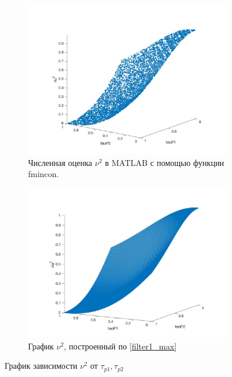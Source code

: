 \documentclass[a4paper,14pt]{article} %
\theoremstyle{cited}
\begin{document}
\begin{figure}[H]
\begin{subfigure}{.5\textwidth}
  \includegraphics[width=9cm]{images/filter1e.jpg}
  \caption{Численная оценка $\nu^2$ в MATLAB с помощью функции fmincon.}
  \label{fig:sub1}
\end{subfigure}%
\begin{subfigure}{.5\textwidth}
\includegraphics[width=9cm]{images/filter1_1.jpg}
  \caption{График $\nu^2$, построенный по \eqref{filter1_max}}
  \label{fig:sub2}
\end{subfigure}
\caption{График зависимости $\nu^2$ от $\tau_{p1}, \tau_{p2}$}
\label{fig:filter1_fig}
\end{figure}

\pagebreak
\end{document}
